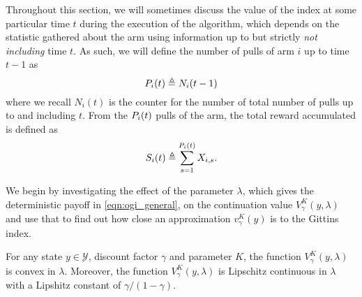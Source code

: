Throughout this section, we will sometimes discuss the value of the index at some particular time $t$ during the execution of the algorithm, which depends on the statistic gathered about the arm using information up to but strictly \emph{not including} time $t$. As such, we will define the number of pulls of arm $i$ up to time $t-1$ as
\[
P_{i}(t) \triangleq N_i(t-1)
\]
where we recall $N_i(t)$ is the counter for the number of total number of pulls up to and including $t$. From the $P_{i}(t)$ pulls of the arm, the total reward accumulated is defined as
\[
S_i(t) \triangleq \sum_{s=1}^{P_{i}(t)} X_{i,s}.
\]

We begin by investigating the effect of the parameter $\lambda$, which gives the deterministic payoff in \eqref{eqn:ogi_general}, on the continuation value $V^K_\gamma(y, \lambda)$ and use that to find out how close an approximation $v^K_\gamma(y)$ is to the Gittins index.
\begin{fact}\label{fact:v_is_convex}
	For any state $y \in \mathcal{Y}$, discount factor $\gamma$ and parameter $K$, the function $V^K_\gamma(y,\lambda)$ is convex in $\lambda$.
	{\color{blue}Moreover, the function $V^K_\gamma(y,\lambda)$ is Lipschitz continuous in $\lambda$ with a Lipshitz constant of $\gamma/(1-\gamma)$.}
\end{fact}

